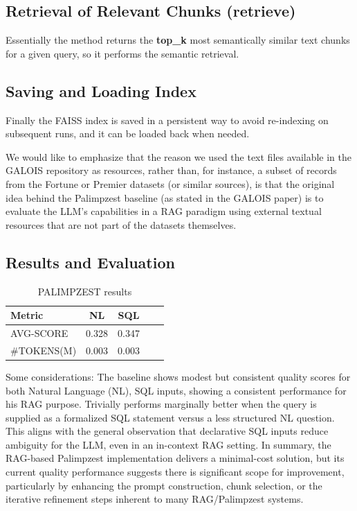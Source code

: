 \subsection{Retrieval of Relevant Chunks (retrieve)}
Essentially the method returns the \textbf{top\_k} most semantically similar text chunks for a given query, so it performs the semantic retrieval.

\subsection{Saving and Loading Index}
Finally the FAISS index is saved in a persistent way to avoid re-indexing on subsequent runs, and it can be loaded back when needed.

We would like to emphasize that the reason we used the text files available in the GALOIS repository as resources, rather than, for instance, a subset of records from the Fortune or Premier datasets (or similar sources), is that the original idea behind the Palimpzest baseline (as stated in the GALOIS paper) is to evaluate the LLM’s capabilities in a RAG paradigm using external textual resources that are not part of the datasets themselves.

\subsection{Results and Evaluation}

\begin{table}[h]
\centering
\begin{tabular}{lcccc}
\toprule
\textbf{Metric} & \textbf{NL} & \textbf{SQL}  \\
\midrule

AVG-SCORE & 0.328 & 0.347  \\
\#TOKENS(M) & 0.003 & 0.003 \\

\bottomrule
\end{tabular}
\caption{PALIMPZEST results}
\label{palimpzest_results}
\end{table}

Some considerations:
The baseline shows modest but consistent quality scores for both Natural Language (NL), SQL inputs, showing a consistent performance for his RAG purpose.
Trivially performs marginally better when the query is supplied as a formalized SQL statement versus a less structured NL question. This aligns with the general observation that declarative SQL inputs reduce ambiguity for the LLM, even in an in-context RAG setting.
In summary, the RAG-based Palimpzest implementation delivers a minimal-cost solution, but its current quality performance suggests there is significant scope for improvement, particularly by enhancing the prompt construction, chunk selection, or the iterative refinement steps inherent to many RAG/Palimpzest systems.


